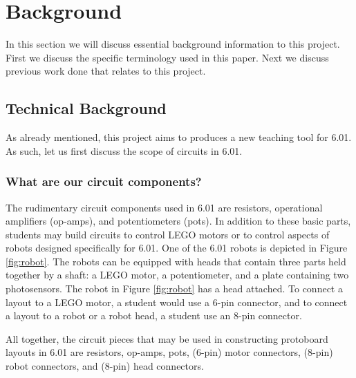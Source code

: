 
\chapter{Background}
\label{ch:background}

In this section we will discuss essential background information to this project.
First we discuss the specific terminology used in this paper. Next we discuss
previous work done that relates to this project.

\section{Technical Background}

As already mentioned, this project aims to produces a new teaching tool for
6.01. As such, let us first discuss the scope of circuits in 6.01.

\subsection{What are our circuit components?}

The rudimentary circuit components used in 6.01 are resistors, operational
amplifiers (op-amps), and potentiometers (pots). In addition to these basic
parts, students may build circuits to control LEGO motors or to control
aspects of robots designed specifically for 6.01. One of the 6.01 robots is
depicted in Figure \ref{fig:robot}. The robots can be equipped with heads that
contain three parts held together by a shaft: a LEGO motor, a potentiometer, and
a plate containing two photosensors. The robot in Figure \ref{fig:robot} has a
head attached. To connect a layout to a LEGO motor, a student would use a 6-pin
connector, and to connect a layout to a robot or a robot head, a student
use an 8-pin connector.

All together, the circuit pieces that may be used in constructing protoboard
layouts in 6.01 are resistors, op-amps, pots, (6-pin) motor connectors, (8-pin)
robot connectors, and (8-pin) head connectors.

